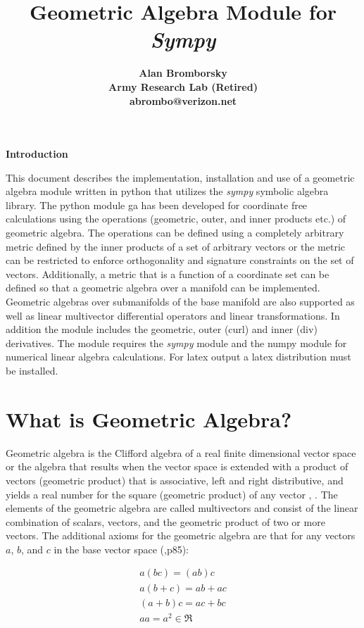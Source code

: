 \documentclass[12pt]{report}
\title{\bf\Large Geometric Algebra Module for \emph{Sympy}}
\author{\bf Alan Bromborsky\\
\bf Army Research Lab (Retired)\\
\bf abrombo@verizon.net}
\newcommand{\lp}{\left (}
\newcommand{\rp}{\right )}
\begin{document}
\parskip 10pt

\maketitle
{\bf Introduction}\newline

   This document describes the implementation, installation and use of a
   geometric algebra module written in
   python that utilizes the \emph{sympy} symbolic algebra library.  The python
   module ga has been developed for coordinate free calculations using
   the operations (geometric, outer, and inner products etc.) of geometric algebra.
   The operations can be defined using a completely arbitrary metric defined
   by the inner products of a set of arbitrary vectors or the metric can be
   restricted to enforce orthogonality and signature constraints on the set of
   vectors.  Additionally, a metric that is a function of a coordinate set can 
   be defined so that a geometric algebra over a manifold can be implemented. 
   Geometric algebras over submanifolds of the base manifold are also supported as
   well as linear multivector differential operators and linear transformations.
   In addition the module includes the geometric, outer (curl) and inner
   (div) derivatives. The module requires the \emph{sympy} module and the numpy module for numerical linear
   algebra calculations.  For latex output a latex distribution must be installed.

\tableofcontents

\chapter{What is Geometric Algebra?}

Geometric algebra is the Clifford algebra of a real finite dimensional vector
space or the algebra that results when the vector space
is extended with a product of vectors (geometric product) that is associative,
left and right distributive, and yields a real number for the square (geometric
product) of any vector \cite{Hestenes}, \cite{Doran}.  The elements of the geometric
algebra are called multivectors and consist of the linear combination of
scalars, vectors, and the geometric product of two or more vectors. The
additional axioms for the geometric algebra are that for any vectors $a$,
$b$, and $c$ in the base vector space (\cite{Doran},p85):

  \begin{equation}
  \begin{array}{c}
  a\lp bc \rp = \lp ab \rp c \\
  a\lp b+c \rp = ab+ac \\
  \lp a + b \rp c = ac+bc \\
  aa = a^{2} \in \Re
  \end{array}
  \end{equation}
\end{document}
